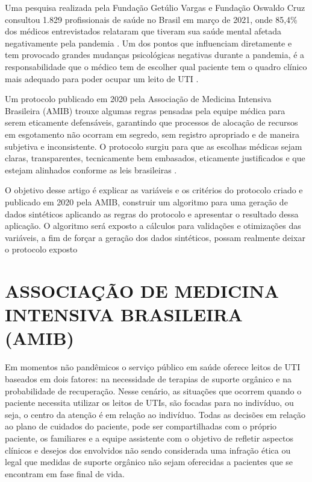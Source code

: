 \documentclass[12pt]{article}
\begin{document}
Uma pesquisa realizada pela Fundação Getúlio Vargas e Fundação Oswaldo Cruz consultou 1.829 profissionais de saúde no Brasil em março de 2021, onde 85,4\% dos médicos entrevistados relataram que tiveram sua saúde mental afetada negativamente pela pandemia \cite{paulomotoryn2021}. Um dos pontos que influenciam diretamente e tem provocado grandes mudanças psicológicas negativas durante a pandemia, é a responsabilidade que o médico tem de escolher qual paciente tem o quadro clínico mais adequado para poder ocupar um leito de UTI \cite{teixeira2020processo}.

Um protocolo publicado em 2020 pela Associação de Medicina Intensiva Brasileira (AMIB) trouxe algumas regras pensadas pela equipe médica para serem eticamente defensáveis, garantindo que processos de alocação de recursos em esgotamento não ocorram em segredo, sem registro apropriado e de maneira subjetiva e inconsistente. O protocolo surgiu para que as escolhas médicas sejam claras, transparentes, tecnicamente bem embasados, eticamente justificados e que estejam alinhados conforme as leis brasileiras \cite{kretzer2020protocolo}.

O objetivo desse artigo é explicar as variáveis e os critérios do protocolo criado e publicado em 2020 pela AMIB, construir um algoritmo para uma geração de dados sintéticos aplicando as regras do protocolo e apresentar o resultado dessa aplicação. O algoritmo será exposto a cálculos para validações e otimizações das variáveis, a fim de forçar a geração dos dados sintéticos, possam realmente deixar o protocolo exposto  

\section{ASSOCIAÇÃO DE MEDICINA INTENSIVA BRASILEIRA (AMIB)}

Em momentos não pandêmicos o serviço público em saúde oferece leitos de UTI baseados em dois fatores: na necessidade de terapias de suporte orgânico e na probabilidade de recuperação. Nesse cenário, as situações que ocorrem quando o paciente necessita utilizar os leitos de UTIs, são focadas para no indivíduo, ou seja, o centro da atenção é em relação ao indivíduo. Todas as decisões em relação ao plano de cuidados do paciente, pode ser compartilhadas com o próprio paciente, os familiares e a equipe assistente com o objetivo de refletir aspectos clínicos e desejos dos envolvidos não sendo considerada uma infração ética ou legal que medidas de suporte orgânico não sejam oferecidas a pacientes que se encontram em fase final de vida. 
\end{document}
